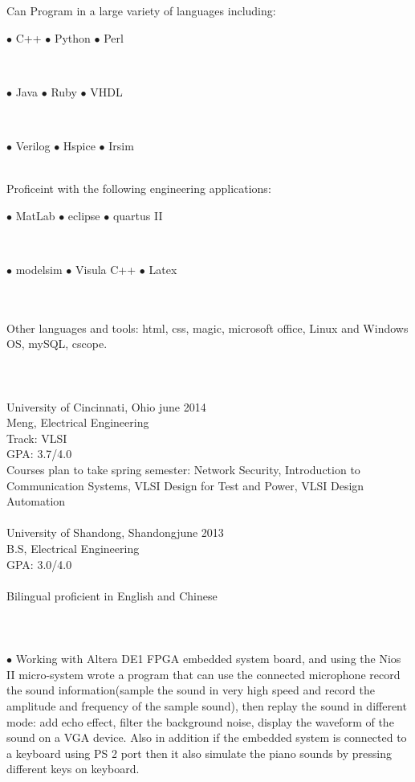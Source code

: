 \documentclass[11pt]{article} %
\begin{document}
\noindent %
Can Program in a large variety of languages including: \\ %
\centerline{\hfill $\bullet$ C++ \hfill $\bullet$ Python \hfill $\bullet$ Perl\hfill}\\
\centerline{\hfill $\bullet$ Java \hfill $\bullet$ Ruby \hfill $\bullet$ VHDL\hfill}\\
\centerline{\hfill $\bullet$ Verilog \hfill $\bullet$ Hspice \hfill $\bullet$ Irsim\hfill}\\
Proficeint with the following engineering applications: \\
\centerline{\hfill $\bullet$ MatLab \hfill $\bullet$ eclipse \hfill $\bullet$ quartus II\hfill}\\
\centerline{\hfill $\bullet$ modelsim \hfill $\bullet$ Visula C++ \hfill $\bullet$ Latex \hfill}\\
\\
Other languages and tools: html, css, magic, microsoft office, Linux and Windows OS, mySQL, cscope.
\\
\\
\\
\noindent
\\
 University of Cincinnati, Ohio \hfill june 2014 \\
                Meng, Electrical Engineering\\
                Track: VLSI \\
                GPA: 3.7/4.0 \\
                Courses plan to take spring semester: Network Security, Introduction to Communication Systems, VLSI Design for Test and Power, VLSI Design Automation
\\ 
\noindent
\\
			    University of Shandong, Shandong\hfill june 2013  \\
                B.S, Electrical Engineering  \\ 
                GPA: 3.0/4.0 
\\
\noindent
\\ Bilingual proficient in English and Chinese
\\
\\
\\
\noindent
\\
$\bullet$ Working with Altera DE1 FPGA embedded system board, and using the Nios II micro-system wrote a program that can use the connected microphone record the sound information(sample the sound in very high speed and record the amplitude and frequency of the sample sound), then replay the sound in different mode: add echo effect, filter the background noise, display the waveform of the sound on a VGA device. Also in addition if the embedded system is connected to a keyboard using PS 2 port then it also simulate the piano sounds by pressing different keys on keyboard.
\end{document}
